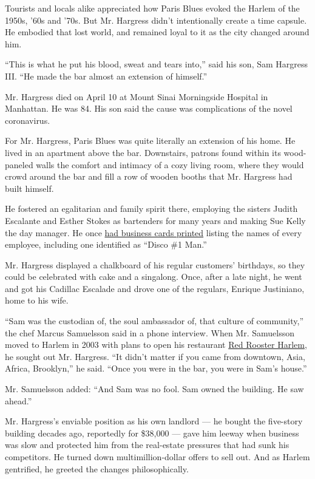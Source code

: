 Tourists and locals alike appreciated how Paris Blues evoked the Harlem
of the 1950s, '60s and '70s. But Mr. Hargress didn't intentionally
create a time capsule. He embodied that lost world, and remained loyal
to it as the city changed around him.

``This is what he put his blood, sweat and tears into,'' said his son,
Sam Hargress III. ``He made the bar almost an extension of himself.''

Mr. Hargress died on April 10 at Mount Sinai Morningside Hospital in
Manhattan. He was 84. His son said the cause was complications of the
novel coronavirus.

For Mr. Hargress, Paris Blues was quite literally an extension of his
home. He lived in an apartment above the bar. Downstairs, patrons found
within its wood-paneled walls the comfort and intimacy of a cozy living
room, where they would crowd around the bar and fill a row of wooden
booths that Mr. Hargress had built himself.

He fostered an egalitarian and family spirit there, employing the
sisters Judith Escalante and Esther Stokes as bartenders for many years
and making Sue Kelly the day manager. He once
\href{https://archive.nytimes.com/query.nytimes.com/gst/fullpage-9A0CEFDB173CF932A05756C0A9669D8B63.html}{had
business cards printed} listing the names of every employee, including
one identified as ``Disco \#1 Man.''

Mr. Hargress displayed a chalkboard of his regular customers' birthdays,
so they could be celebrated with cake and a singalong. Once, after a
late night, he went and got his Cadillac Escalade and drove one of the
regulars, Enrique Justiniano, home to his wife.

``Sam was the custodian of, the soul ambassador of, that culture of
community,'' the chef Marcus Samuelsson said in a phone interview. When
Mr. Samuelsson moved to Harlem in 2003 with plans to open his restaurant
\href{https://www.nytimes.com/2011/03/09/dining/reviews/09rest.html}{Red
Rooster Harlem}, he sought out Mr. Hargress. ``It didn't matter if you
came from downtown, Asia, Africa, Brooklyn,'' he said. ``Once you were
in the bar, you were in Sam's house.''

Mr. Samuelsson added: ``And Sam was no fool. Sam owned the building. He
saw ahead.''

Mr. Hargress's enviable position as his own landlord --- he bought the
five-story building decades ago, reportedly for \$38,000 --- gave him
leeway when business was slow and protected him from the real-estate
pressures that had sunk his competitors. He turned down
multimillion-dollar offers to sell out. And as Harlem gentrified, he
greeted the changes philosophically.

